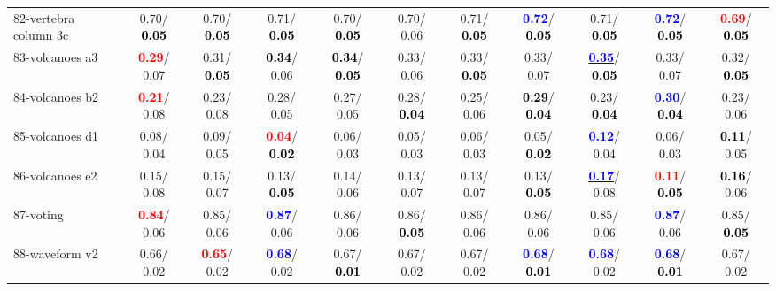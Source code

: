 \begin{table}[h]
\begin{center}
{\begin{tabular}{lc|c|c|c|c|c|c|c|c|c}
82-vertebra column 3c &   0.70/\textcolor{black}{\textbf{  0.05}} &   0.70/\textcolor{black}{\textbf{  0.05}} &   0.71/\textcolor{black}{\textbf{  0.05}} &   0.70/\textcolor{black}{\textbf{  0.05}} &   0.70/  0.06 &   0.71/\textcolor{black}{\textbf{  0.05}} & \textcolor{blue}{\textbf{  0.72}}/\textcolor{black}{\textbf{  0.05}} &   0.71/\textcolor{black}{\textbf{  0.05}} & \textcolor{blue}{\textbf{  0.72}}/\textcolor{black}{\textbf{  0.05}} & \textcolor{red}{\textbf{  0.69}}/\textcolor{black}{\textbf{  0.05}} \\
83-volcanoes a3 & \textcolor{red}{\textbf{  0.29}}/  0.07 &   0.31/\textcolor{black}{\textbf{  0.05}} & \textcolor{black}{\textbf{  0.34}}/  0.06 & \textcolor{black}{\textbf{  0.34}}/\textcolor{black}{\textbf{  0.05}} &   0.33/  0.06 &   0.33/\textcolor{black}{\textbf{  0.05}} &   0.33/  0.07 & \underline{\textcolor{blue}{\textbf{  0.35}}}/\textcolor{black}{\textbf{  0.05}} &   0.33/  0.07 &   0.32/\textcolor{black}{\textbf{  0.05}} \\
84-volcanoes b2 & \textcolor{red}{\textbf{  0.21}}/  0.08 &   0.23/  0.08 &   0.28/  0.05 &   0.27/  0.05 &   0.28/\textcolor{black}{\textbf{  0.04}} &   0.25/  0.06 & \textcolor{black}{\textbf{  0.29}}/\textcolor{black}{\textbf{  0.04}} &   0.23/\textcolor{black}{\textbf{  0.04}} & \underline{\textcolor{blue}{\textbf{  0.30}}}/\textcolor{black}{\textbf{  0.04}} &   0.23/  0.06 \\
85-volcanoes d1 &   0.08/  0.04 &   0.09/  0.05 & \textcolor{red}{\textbf{  0.04}}/\textcolor{black}{\textbf{  0.02}} &   0.06/  0.03 &   0.05/  0.03 &   0.06/  0.03 &   0.05/\textcolor{black}{\textbf{  0.02}} & \underline{\textcolor{blue}{\textbf{  0.12}}}/  0.04 &   0.06/  0.03 & \textcolor{black}{\textbf{  0.11}}/  0.05 \\ \hline
86-volcanoes e2 &   0.15/  0.08 &   0.15/  0.07 &   0.13/\textcolor{black}{\textbf{  0.05}} &   0.14/  0.06 &   0.13/  0.07 &   0.13/  0.07 &   0.13/\textcolor{black}{\textbf{  0.05}} & \underline{\textcolor{blue}{\textbf{  0.17}}}/  0.08 & \textcolor{red}{\textbf{  0.11}}/\textcolor{black}{\textbf{  0.05}} & \textcolor{black}{\textbf{  0.16}}/  0.06 \\
87-voting & \textcolor{red}{\textbf{  0.84}}/  0.06 &   0.85/  0.06 & \textcolor{blue}{\textbf{  0.87}}/  0.06 &   0.86/  0.06 &   0.86/\textcolor{black}{\textbf{  0.05}} &   0.86/  0.06 &   0.86/  0.06 &   0.85/  0.06 & \textcolor{blue}{\textbf{  0.87}}/  0.06 &   0.85/\textcolor{black}{\textbf{  0.05}} \\
88-waveform v2 &   0.66/  0.02 & \textcolor{red}{\textbf{  0.65}}/  0.02 & \textcolor{blue}{\textbf{  0.68}}/  0.02 &   0.67/\textcolor{black}{\textbf{  0.01}} &   0.67/  0.02 &   0.67/  0.02 & \textcolor{blue}{\textbf{  0.68}}/\textcolor{black}{\textbf{  0.01}} & \textcolor{blue}{\textbf{  0.68}}/  0.02 & \textcolor{blue}{\textbf{  0.68}}/\textcolor{black}{\textbf{  0.01}} &   0.67/  0.02 \\

\end{tabular}}
\end{center}
\end{table}
